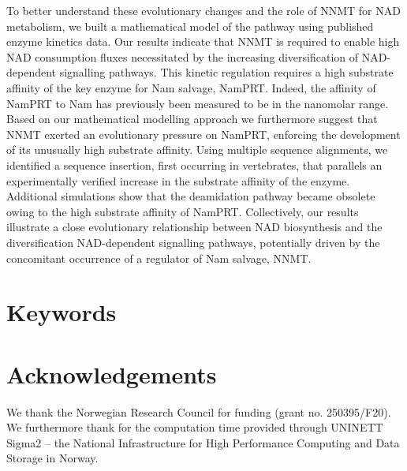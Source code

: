 \documentclass[paper=a4, 12pt]{scrartcl}
\begin{document}
To better understand these evolutionary changes and the role of NNMT for NAD metabolism, we built a mathematical model of the pathway using published enzyme kinetics data. Our results indicate that NNMT is required to enable high NAD consumption fluxes necessitated by the increasing diversification of NAD-dependent signalling pathways. This kinetic regulation requires a high substrate affinity of the key enzyme for Nam salvage, NamPRT. Indeed, the affinity of NamPRT to Nam has previously been measured to be in the nanomolar range. Based on our mathematical modelling approach we furthermore suggest that NNMT exerted an evolutionary pressure on NamPRT, enforcing the development of its unusually high substrate affinity. Using multiple sequence alignments, we identified a sequence insertion, first occurring in vertebrates, that parallels an experimentally verified increase in the substrate affinity of the enzyme. Additional simulations show that the deamidation pathway became obsolete owing to the high substrate affinity of NamPRT. Collectively, our results illustrate a close evolutionary relationship between NAD biosynthesis and the diversification NAD-dependent signalling pathways, potentially driven by the concomitant occurrence of a regulator of Nam salvage, NNMT.


\section{Keywords}














\section*{Acknowledgements}

We thank the Norwegian Research Council for funding (grant no. 250395/F20). We furthermore thank for the computation time provided through UNINETT Sigma2 – the National Infrastructure for High Performance Computing and Data Storage in Norway.



\end{document}
